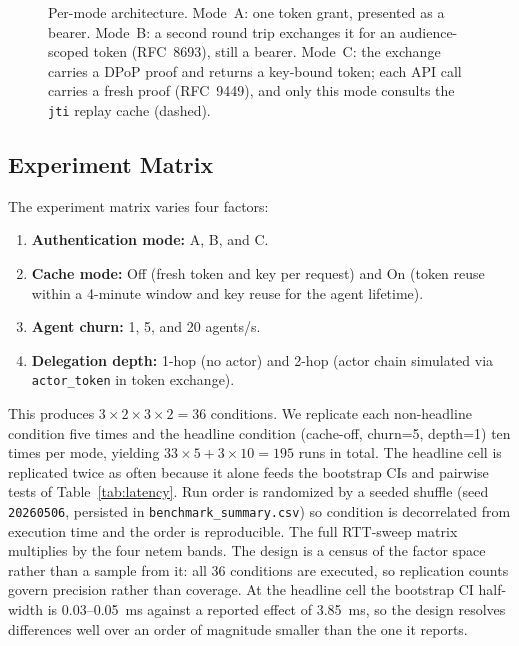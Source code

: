 \documentclass[conference]{IEEEtran}
\begin{document}
\begin{figure}[htbp]
{%
}
\caption{Per-mode architecture. Mode~A: one token grant, presented as a bearer. Mode~B: a second round trip exchanges it for an audience-scoped token (RFC~8693), still a bearer. Mode~C: the exchange carries a DPoP proof and returns a key-bound token; each API call carries a fresh proof (RFC~9449), and only this mode consults the \texttt{jti} replay cache (dashed).}
\label{fig:architecture}
\end{figure}

\subsection{Experiment Matrix}

The experiment matrix varies four factors:
\begin{enumerate}
    \item \textbf{Authentication mode:} A, B, and C.
    \item \textbf{Cache mode:} Off (fresh token and key per request) and On (token reuse within a 4-minute window and key reuse for the agent lifetime).
    \item \textbf{Agent churn:} 1, 5, and 20 agents/s.
    \item \textbf{Delegation depth:} 1-hop (no actor) and 2-hop (actor chain simulated via \texttt{actor\_token} in token exchange).
\end{enumerate}

This produces $3 \times 2 \times 3 \times 2 = 36$ conditions. We replicate each non-headline condition five times and the headline condition (cache-off, churn=5, depth=1) ten times per mode, yielding $33 \times 5 + 3 \times 10 = 195$ runs in total. The headline cell is replicated twice as often because it alone feeds the bootstrap CIs and pairwise tests of Table~\ref{tab:latency}. Run order is randomized by a seeded shuffle (seed \texttt{20260506}, persisted in \texttt{benchmark\_summary.csv}) so condition is decorrelated from execution time and the order is reproducible. The full RTT-sweep matrix multiplies by the four netem bands. The design is a census of the factor space rather than a sample from it: all 36 conditions are executed, so replication counts govern precision rather than coverage. At the headline cell the bootstrap CI half-width is 0.03--0.05~ms against a reported effect of 3.85~ms, so the design resolves differences well over an order of magnitude smaller than the one it reports.
\end{document}
